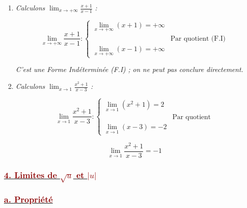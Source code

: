 \documentclass[12pt,a4paper]{article}
\begin{document}
\begin{enumerate}
    \[
    \boxed{\lim_{x \to 1^+} \frac{x - 3}{x - 1} = -\infty}
    \]

    \vspace{0.4cm}

    \item \textit{Calculons $\displaystyle \lim_{x \to +\infty} \frac{x + 1}{x - 1}$ :}
    
    \vspace{0.2cm}
    
    \[
    \lim_{x \to +\infty} \frac{x + 1}{x - 1} :
    \begin{cases}
    \displaystyle \lim_{x \to +\infty} (x + 1) = +\infty \\
    & \text{Par quotient (F.I)} \\
    \displaystyle \lim_{x \to +\infty} (x - 1) = +\infty
    \end{cases}
    \]
    
    \vspace{0.2cm}
    \textit{C'est une Forme Indéterminée (F.I) ; on ne peut pas conclure directement.}

    \vspace{0.4cm}

    \item \textit{Calculons $\displaystyle \lim_{x \to 1} \frac{x^2 + 1}{x - 3}$ :}
    
    \vspace{0.2cm}
    
    \[
    \lim_{x \to 1} \frac{x^2 + 1}{x - 3} :
    \begin{cases}
    \displaystyle \lim_{x \to 1} (x^2 + 1) = 2 \\
    & \text{Par quotient} \\
    \displaystyle \lim_{x \to 1} (x - 3) = -2
    \end{cases}
    \]
    
    \[
    \boxed{\lim_{x \to 1} \frac{x^2 + 1}{x - 3} = -1}
    \]
\end{enumerate}

\subsubsection*{\underline{\textcolor{darkred}{ 4. Limites de $\sqrt{u}$ et $|u|$} }}
\subsubsection*{\underline{\textcolor{darkred}{ a. Propriété }}}
\end{document}
